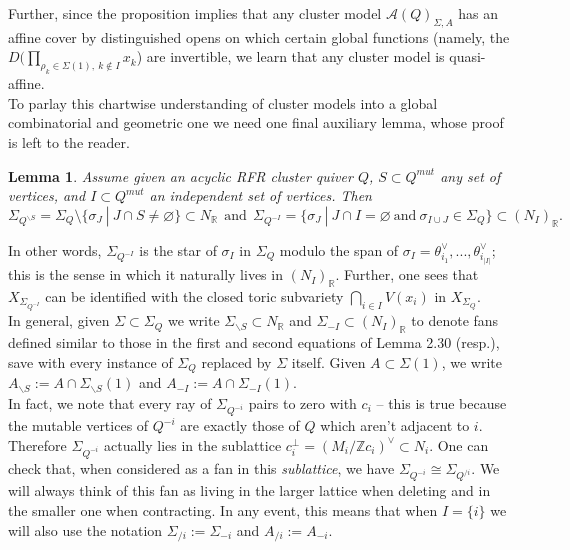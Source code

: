 \documentclass[11pt]{amsart}
\newtheorem{lem}[thm]{Lemma}
\theoremstyle{definition}
\theoremstyle{remark}
\renewcommand{\emptyset}{\varnothing}
\numberwithin{equation}{section}
\begin{document}
Further, since the proposition implies that any cluster model $\mathcal{A}(Q)_{\Sigma, A}$ has an affine cover by distinguished opens on which certain global functions (namely, the $D(\prod_{\rho_k\in\Sigma(1),\ k\notin I}x_k$) are invertible, we learn that any cluster model is quasi-affine.\\ 

To parlay this chartwise understanding of cluster models into a global combinatorial and geometric one we need one final auxiliary lemma, whose proof is left to the reader.


\begin{lem}\label{fan operations}
    Assume given an acyclic RFR cluster quiver $Q$, $S \subset Q^{mut}$ any set of vertices, and $I \subset Q^{mut}$ an independent set of vertices. Then $$\Sigma_{Q^{\backslash S}} = \Sigma_Q \setminus \{\sigma_J\:|\: J \cap S \neq \emptyset\} \subset N_\mathbb{R}\:\:\text{and}\:\: \Sigma_{Q^{-I}} =\{\sigma_J\:|\: J \cap I = \emptyset\:\text{and}\:\sigma_{I \cup J} \in \Sigma_Q\} \subset (N_I)_\mathbb{R}.$$
\end{lem}

In other words, $\Sigma_{Q^{-I}}$ is the star of $\sigma_I$ in $\Sigma_Q$ modulo the span of $\sigma_I = \theta_{i_1}^\vee, ..., \theta_{i_{|I|}}^\vee$; this is the sense in which it naturally lives in $(N_I)_\mathbb{R}$. Further, one sees that $X_{\Sigma_{Q^{-I}}}$ can be identified with the closed toric subvariety $\bigcap_{i \in I} V(x_i)$ in $X_{\Sigma_Q}$.\\

In general, given $\Sigma \subset \Sigma_Q$ we write $\Sigma_{\backslash S} \subset N_\mathbb{R}$ and $\Sigma_{-I} \subset (N_I)_\mathbb{R}$ to denote fans defined similar to those in the first and second equations of Lemma 2.30 (resp.), save with every instance of $\Sigma_Q$ replaced by $\Sigma$ itself. Given $A \subset \Sigma(1)$, we write $A_{\backslash S} := A \cap \Sigma_{\backslash S}(1)$ and $A_{-I} := A \cap \Sigma_{-I}(1)$.\\

In fact, we note that every ray of $\Sigma_{Q^{-i}}$ pairs to zero with $c_i$ -- this is true because the mutable vertices of $Q^{-i}$ are exactly those of $Q$ which aren't adjacent to $i$. Therefore $\Sigma_{Q^{-i}}$ actually lies in the sublattice $c_i^\perp=(M_i/\mathbb Zc_i)^\vee\subset N_i$. One can check that, when considered as a fan in this \textit{sublattice}, we have $\Sigma_{Q^{-i}} \cong \Sigma_{Q^{/i}}$. We will always think of this fan as living in the larger lattice when deleting and in the smaller one when contracting. In any event, this means that when $I = \{i\}$ we will also use the notation $\Sigma_{/i} := \Sigma_{-i}$ and $A_{/i} := A_{-i}$.\\
\end{document}
